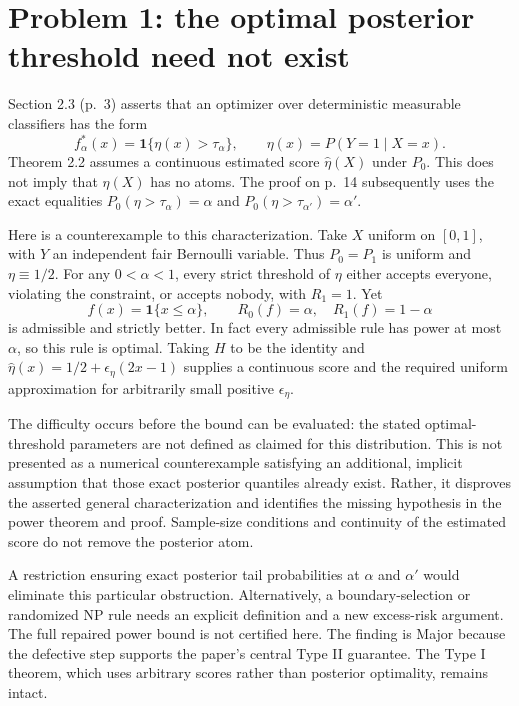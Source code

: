 \documentclass[10pt]{article}
\begin{document}
\section*{Problem 1: the optimal posterior threshold need not exist}
Section 2.3 (p. 3) asserts that an optimizer over deterministic measurable classifiers has the form \[f_\alpha^*(x)=\mathbf1\{\eta(x)>\tau_\alpha\},
 \qquad \eta(x)=P(Y=1\mid X=x).\] Theorem 2.2 assumes a continuous estimated score \(\widehat\eta(X)\) under \(P_0\). This does not imply that \(\eta(X)\) has no atoms. The proof on p. 14 subsequently uses the exact equalities \(P_0(\eta>\tau_\alpha)=\alpha\) and \(P_0(\eta>\tau_{\alpha'})=\alpha'\).\par
Here is a counterexample to this characterization. Take \(X\) uniform on \([0,1]\), with \(Y\) an independent fair Bernoulli variable. Thus \(P_0=P_1\) is uniform and \(\eta\equiv1/2\). For any \(0<\alpha<1\), every strict threshold of \(\eta\) either accepts everyone, violating the constraint, or accepts nobody, with \(R_1=1\). Yet \[f(x)=\mathbf1\{x\le\alpha\},\qquad
 R_0(f)=\alpha,\quad R_1(f)=1-\alpha\] is admissible and strictly better. In fact every admissible rule has power at most \(\alpha\), so this rule is optimal. Taking \(H\) to be the identity and \(\widehat\eta(x)=1/2+\epsilon_\eta(2x-1)\) supplies a continuous score and the required uniform approximation for arbitrarily small positive \(\epsilon_\eta\).\par
The difficulty occurs before the bound can be evaluated: the stated optimal-threshold parameters are not defined as claimed for this distribution. This is not presented as a numerical counterexample satisfying an additional, implicit assumption that those exact posterior quantiles already exist. Rather, it disproves the asserted general characterization and identifies the missing hypothesis in the power theorem and proof. Sample-size conditions and continuity of the estimated score do not remove the posterior atom.\par
A restriction ensuring exact posterior tail probabilities at \(\alpha\) and \(\alpha'\) would eliminate this particular obstruction. Alternatively, a boundary-selection or randomized NP rule needs an explicit definition and a new excess-risk argument. The full repaired power bound is not certified here. The finding is Major because the defective step supports the paper’s central Type II guarantee. The Type I theorem, which uses arbitrary scores rather than posterior optimality, remains intact.\par
\end{document}
